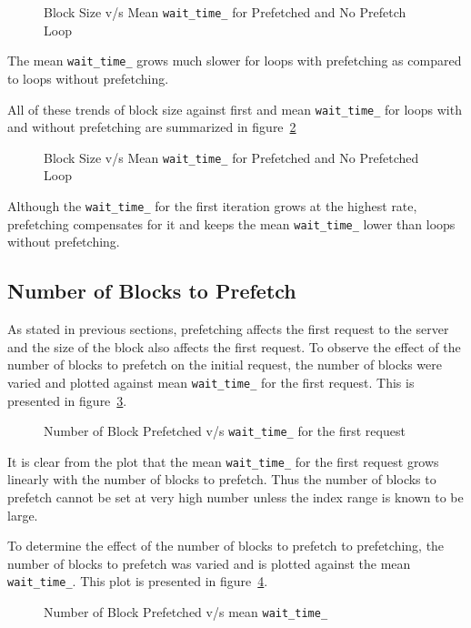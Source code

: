 \begin{figure}[h]
  
  \caption{Block Size v/s Mean \texttt{wait\_time\_} for Prefetched and No Prefetch Loop}
  \label{fig:block_size_avg_wait_time}
\end{figure}

The mean \texttt{wait\_time\_} grows much slower for loops with prefetching as compared
to loops without prefetching.

All of these trends of block size against first and mean \texttt{wait\_time\_} for
loops with and without prefetching are summarized in figure~\ref{fig:block_size_avg_all}
\begin{figure}[h]
  
  \caption{Block Size v/s Mean \texttt{wait\_time\_} for Prefetched and No Prefetched Loop}
  \label{fig:block_size_avg_all}
\end{figure}

Although the \texttt{wait\_time\_} for the first iteration grows at the highest rate,
prefetching compensates for it and keeps the mean \texttt{wait\_time\_} lower than
loops without prefetching.

\subsection{Number of Blocks to Prefetch}
As stated in previous sections, prefetching affects the first request to the server
and the size of the block also affects the first request. To observe the effect of
the number of blocks to prefetch on the initial request, the number of blocks were
varied and plotted against mean \texttt{wait\_time\_} for the first request. This is
presented in figure~\ref{fig:look_ahead_first_wait_time}.
\begin{figure}[h]
  
  \caption{Number of Block Prefetched v/s \texttt{wait\_time\_} for the first request}
  \label{fig:look_ahead_first_wait_time}
\end{figure}

It is clear from the plot that the mean \texttt{wait\_time\_} for the first request
grows linearly with the number of blocks to prefetch. Thus the number of blocks
to prefetch cannot be set at very high number unless the index range is
known to be large.

To determine the effect of the number of blocks to prefetch to prefetching, the number
of blocks to prefetch was varied and is plotted against the mean \texttt{wait\_time\_}.
This plot is presented in figure~\ref{fig:look_ahead_avg_wait_time}.
\begin{figure}[h]
  
  \caption{Number of Block Prefetched v/s mean \texttt{wait\_time\_}}
  \label{fig:look_ahead_avg_wait_time}
\end{figure}

